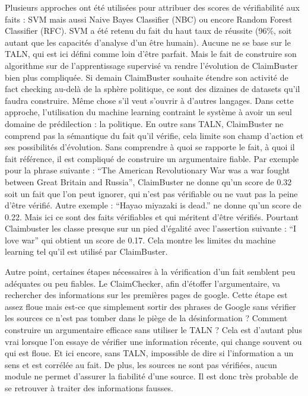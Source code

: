 Plusieurs approches ont été utilisées pour attribuer des scores de vérifiabilité aux faits : SVM mais aussi Naive Bayes Classifier (NBC) ou encore Random Forest Classifier (RFC). SVM a été retenu du fait du haut taux de réussite (96\%, soit autant que les capacités d'analyse d'un être humain). Aucune ne se base sur le TALN, qui est ici défini comme loin d'être parfait. Mais le fait de construire son algorithme sur de l'apprentissage supervisé va rendre l'évolution de ClaimBuster bien plus compliquée. Si demain ClaimBuster souhaite étendre son activité de fact checking au-delà de la sphère politique, ce sont des dizaines de datasets qu'il faudra construire. Même chose s'il veut s'ouvrir à d'autres langages. Dans cette approche, l'utilisation du machine learning contraint le système à avoir un seul domaine de prédilection : la politique. En outre sans TALN, ClaimBuster ne comprend pas la sémantique du fait qu'il vérifie, cela limite son champ d'action et ses possibilités d'évolution. Sans comprendre à quoi se rapporte le fait, à quoi il fait référence, il est compliqué de construire un argumentaire fiable. Par exemple pour la phrase suivante : \enquote{The American Revolutionary War was a war fought between Great Britain and Russia}, ClaimBuster ne donne qu'un score de 0.32 soit un fait que l'on peut ignorer, qui n'est pas vérifiable ou ne vaut pas la peine d'être vérifié. Autre exemple : \enquote{Hayao miyazaki is dead.} ne donne qu'un score de 0.22. Mais ici ce sont des faits vérifiables et qui méritent d'être vérifiés. Pourtant Claimbuster les classe presque sur un pied d'égalité avec l'assertion suivante : \enquote{I love war} qui obtient un score de 0.17. Cela montre les limites du machine learning tel qu'il est utilisé par ClaimBuster.

Autre point, certaines étapes nécessaires à la vérification d'un fait semblent peu adéquates ou peu fiables. Le ClaimChecker, afin d'étoffer l'argumentaire, va rechercher des informations sur les premières pages de google. Cette étape est assez floue mais est-ce que simplement sortir des phrases de Google sans vérifier les sources ce n'est pas tomber dans le piège de la désinformation ? Comment construire un argumentaire efficace sans utiliser le TALN ? Cela est d'autant plus vrai lorsque l'on essaye de vérifier une information récente, qui change souvent ou qui est floue. Et ici encore, sans TALN, impossible de dire si l'information a un sens et est corrélée au fait. De plus, les sources ne sont pas vérifiées, aucun module ne permet d'assurer la fiabilité d'une source. Il est donc très probable de se retrouver à traiter des informations fausses.

